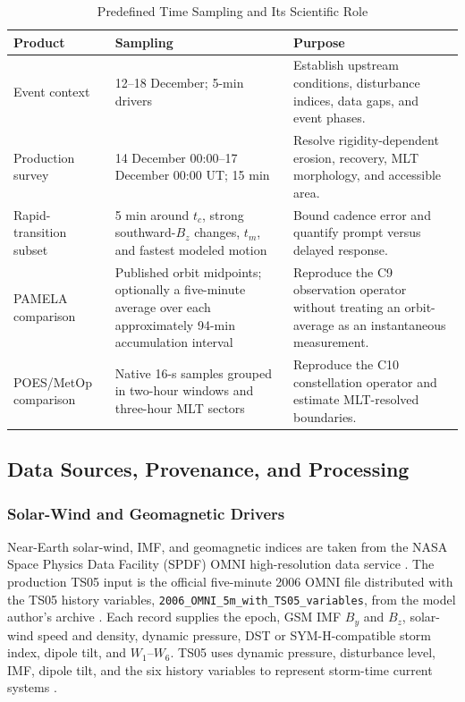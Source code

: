 \begin{table}
\caption{Predefined Time Sampling and Its Scientific Role}
\label{tab:exp-time-sampling}
\centering
\small
\begin{tabular}{p{}p{}p{}}
\toprule
Product & Sampling & Purpose \\
\midrule
Event context & 12--18 December; 5-min drivers & Establish upstream conditions, disturbance indices, data gaps, and event phases. \\
Production survey & 14 December 00:00--17 December 00:00 UT; 15 min & Resolve rigidity-dependent erosion, recovery, MLT morphology, and accessible area. \\
Rapid-transition subset & 5 min around $t_c$, strong southward-$B_z$ changes, $t_m$, and fastest modeled motion & Bound cadence error and quantify prompt versus delayed response. \\
PAMELA comparison & Published orbit midpoints; optionally a five-minute average over each approximately 94-min accumulation interval & Reproduce the C9 observation operator without treating an orbit-average as an instantaneous measurement. \\
POES/MetOp comparison & Native 16-s samples grouped in two-hour windows and three-hour MLT sectors & Reproduce the C10 constellation operator and estimate MLT-resolved boundaries. \\
\bottomrule
\end{tabular}
\end{table}

\subsection{Data Sources, Provenance, and Processing}

\subsubsection{Solar-Wind and Geomagnetic Drivers}

Near-Earth solar-wind, IMF, and geomagnetic indices are taken from the NASA
Space Physics Data Facility (SPDF) OMNI high-resolution data service
\cite{King-2005-JGR,NASA-SPDF-OMNI-2026}. The production TS05 input is the
official five-minute 2006 OMNI file distributed with the TS05 history
variables, \texttt{2006\_OMNI\_5m\_with\_TS05\_variables}, from the model
author's archive \cite{Tsyganenko-TS05-Drivers-2006}. Each record supplies the
epoch, GSM IMF $B_y$ and $B_z$, solar-wind speed and density, dynamic pressure,
DST or SYM-H-compatible storm index, dipole tilt, and $W_1$--$W_6$. TS05 uses
dynamic pressure, disturbance level, IMF, dipole tilt, and the six history
variables to represent storm-time current systems \cite{Tsyganenko-2005-JGR}.

